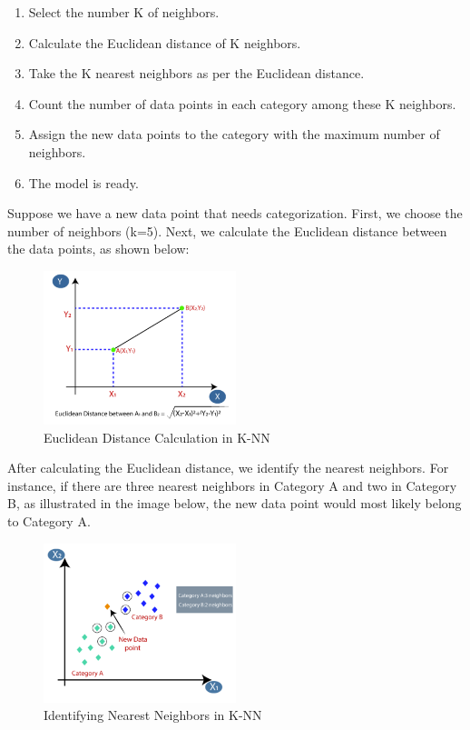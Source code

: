 \begin{enumerate}
	\begin{enumerate}
		\item Select the number K of neighbors.
		\item Calculate the Euclidean distance of K neighbors.
		\item Take the K nearest neighbors as per the Euclidean distance.
		\item Count the number of data points in each category among these K neighbors.
		\item Assign the new data points to the category with the maximum number of neighbors.
		\item The model is ready.
	\end{enumerate}
	Suppose we have a new data point that needs categorization. First, we choose the number of neighbors (k=5). Next, we calculate the Euclidean distance between the data points, as shown below:
	\begin{figure}[h]
		\centering
		\includegraphics[width=0.5\textwidth]{picture/KNN2}
		\caption{Euclidean Distance Calculation in K-NN}
		\label{fig:knn2}
	\end{figure}
	
	After calculating the Euclidean distance, we identify the nearest neighbors. For instance, if there are three nearest neighbors in Category A and two in Category B, as illustrated in the image below, the new data point would most likely belong to Category A.
	\begin{figure}[h]
		\centering
		\includegraphics[width=0.5\textwidth]{picture/KNN3}
		\caption{Identifying Nearest Neighbors in K-NN}
		\label{fig:knn3}
	\end{figure}
	

\end{enumerate}
